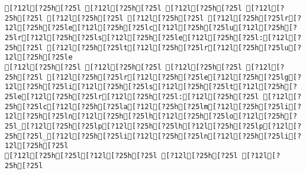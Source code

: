 \documentclass{scrartcl}
\begin{document}
\begin{Verbatim}
[?12l[?25h[?25l [?12l[?25h[?25l [?12l[?25h[?25l [?12l[?25h[?25l [?12l[?25h[?25l [?12l[?25h[?25l [?12l[?25h[?25lr[?12l[?25h[?25le[?12l[?25h[?25lc[?12l[?25h[?25lu[?12l[?25h[?25lr[?12l[?25h[?25ls[?12l[?25h[?25le[?12l[?25h[?25l:[?12l[?25h[?25l [?12l[?25h[?25lt[?12l[?25h[?25lr[?12l[?25h[?25lu[?12l[?25h[?25le
[?12l[?25h[?25l [?12l[?25h[?25l [?12l[?25h[?25l [?12l[?25h[?25l [?12l[?25h[?25lr[?12l[?25h[?25le[?12l[?25h[?25lg[?12l[?25h[?25li[?12l[?25h[?25ls[?12l[?25h[?25lt[?12l[?25h[?25le[?12l[?25h[?25lr[?12l[?25h[?25l:[?12l[?25h[?25l [?12l[?25h[?25lc[?12l[?25h[?25la[?12l[?25h[?25lm[?12l[?25h[?25li[?12l[?25h[?25ln[?12l[?25h[?25lh[?12l[?25h[?25lo[?12l[?25h[?25l_[?12l[?25h[?25lp[?12l[?25h[?25lh[?12l[?25h[?25lp[?12l[?25h[?25l_[?12l[?25h[?25li[?12l[?25h[?25ln[?12l[?25h[?25li[?12l[?25h[?25l
[?12l[?25h[?25l[?12l[?25h[?25l [?12l[?25h[?25l [?12l[?25h[?25l

\end{Verbatim}
\end{document}
